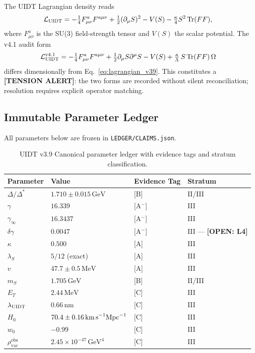 \documentclass[12pt,a4paper]{article}
\newcommand{\UIDT}{\textsc{UIDT}}
\newcommand{\Lag}{\mathcal{L}}
\newcommand{\kap}{\kappa}
\newcommand{\lams}{\lambda_S}
\newcommand{\gam}{\gamma}
\newcommand{\Dstar}{\Delta^*}
\newcommand{\rhobs}{\rho_{\mathrm{vac}}^{\mathrm{obs}}}
\newcommand{\Fmn}{F^a_{\mu\nu}}
\newcommand{\openitem}[1]{\textbf{[OPEN: #1]}}
\begin{document}
The \UIDT{} Lagrangian density reads
\begin{equation}
  \Lag_{\UIDT} = -\tfrac{1}{4}\Fmn F^{a\mu\nu}
  + \tfrac{1}{2}(\partial_\mu S)^2 - V(S)
  - \tfrac{\kap}{4}S^2\,\mathrm{Tr}(FF),
  \label{eq:lagrangian_v39}
\end{equation}
where $F^a_{\mu\nu}$ is the SU(3) field-strength tensor and $V(S)$ the
scalar potential.
The v4.1 audit form
\begin{equation}
  \Lag_{\UIDT}^{\mathrm{v4.1}} = -\tfrac{1}{4}\Fmn F^{a\mu\nu}
  + \tfrac{1}{2}\partial_\mu S\partial^\mu S - V(S)
  + \tfrac{\kap}{\Lambda}\,S\,\mathrm{Tr}(FF)\,\Omega
  \label{eq:lagrangian_v41}
\end{equation}
differs dimensionally from Eq.~\eqref{eq:lagrangian_v39}.
This constitutes a \textbf{[TENSION ALERT]}: the two forms are recorded
without silent reconciliation; resolution requires explicit operator matching.

\subsection{Immutable Parameter Ledger}

All parameters below are frozen in \texttt{LEDGER/CLAIMS.json}.

\begin{table}[h!]
  \centering
  \caption{\UIDT{} v3.9 Canonical parameter ledger with evidence tags
           and stratum classification.}
  \label{tab:ledger}
  \renewcommand{\arraystretch}{1.25}
  \begin{tabular}{llll}
    \toprule
    Parameter & Value & Evidence Tag & Stratum \\
    \midrule
    $\Delta / \Dstar$ & $1.710 \pm 0.015\,\text{GeV}$ & [B] & II/III \\
    $\gam$ & $16.339$ & [A$^-$] & III \\
    $\gam_\infty$ & $16.3437$ & [A$^-$] & III \\
    $\delta\gam$ & $0.0047$ & [A$^-$] & III — \openitem{L4} \\
    $\kap$ & $0.500$ & [A] & III \\
    $\lams$ & $5/12$ (exact) & [A] & III \\
    $v$ & $47.7 \pm 0.5\,\text{MeV}$ & [A] & III \\
    $m_S$ & $1.705\,\text{GeV}$ & [B] & II/III \\
    $E_T$ & $2.44\,\text{MeV}$ & [C] & III \\
    $\lambda_{\UIDT}$ & $0.66\,\text{nm}$ & [C] & III \\
    $H_0$ & $70.4 \pm 0.16\,\text{km\,s}^{-1}\text{Mpc}^{-1}$ & [C] & III \\
    $w_0$ & $-0.99$ & [C] & III \\
    $\rhobs$ & $2.45\times10^{-47}\,\text{GeV}^4$ & [C] & III \\
    \bottomrule
  \end{tabular}
\end{table}
\end{document}
